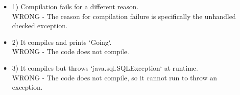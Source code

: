 \documentclass[12pt]{article}
\begin{document}
\begin{enumerate}[label=(\arabic*)]
\begin{itemize}
\item 1) Compilation fails for a different reason.
 \\ 
WRONG - The reason for compilation failure is specifically the unhandled checked exception.

\item 2) It compiles and prints `Going`.
 \\ 
WRONG - The code does not compile.

\item 3) It compiles but throws `java.sql.SQLException` at runtime.
 \\ 
WRONG - The code does not compile, so it cannot run to throw an exception.

\end{itemize}

\end{enumerate}
\end{document}
